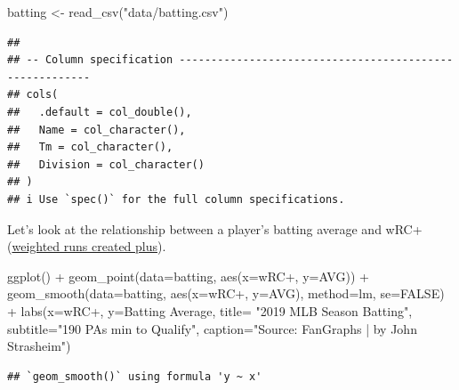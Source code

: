 \documentclass[
]{book}
\newenvironment{Shaded}{\begin{snugshade}}{\end{snugshade}}
\newcommand{\AttributeTok}[1]{\textcolor[rgb]{0.77,0.63,0.00}{#1}}
\newcommand{\ConstantTok}[1]{\textcolor[rgb]{0.00,0.00,0.00}{#1}}
\newcommand{\FunctionTok}[1]{\textcolor[rgb]{0.00,0.00,0.00}{#1}}
\newcommand{\NormalTok}[1]{#1}
\newcommand{\OtherTok}[1]{\textcolor[rgb]{0.56,0.35,0.01}{#1}}
\newcommand{\SpecialCharTok}[1]{\textcolor[rgb]{0.00,0.00,0.00}{#1}}
\newcommand{\StringTok}[1]{\textcolor[rgb]{0.31,0.60,0.02}{#1}}
\begin{document}
\begin{Shaded}
\begin{Highlighting}[]
\NormalTok{batting }\OtherTok{\textless{}{-}} \FunctionTok{read\_csv}\NormalTok{(}\StringTok{"data/batting.csv"}\NormalTok{)}
\end{Highlighting}
\end{Shaded}

\begin{verbatim}
## 
## -- Column specification --------------------------------------------------------
## cols(
##   .default = col_double(),
##   Name = col_character(),
##   Tm = col_character(),
##   Division = col_character()
## )
## i Use `spec()` for the full column specifications.
\end{verbatim}

Let's look at the relationship between a player's batting average and wRC+ (\href{http://m.mlb.com/glossary/advanced-stats/weighted-runs-created-plus}{weighted runs created plus}).

\begin{Shaded}
\begin{Highlighting}[]
\FunctionTok{ggplot}\NormalTok{() }\SpecialCharTok{+}
  \FunctionTok{geom\_point}\NormalTok{(}\AttributeTok{data=}\NormalTok{batting, }\FunctionTok{aes}\NormalTok{(}\AttributeTok{x=}\StringTok{\textasciigrave{}}\AttributeTok{wRC+}\StringTok{\textasciigrave{}}\NormalTok{, }\AttributeTok{y=}\NormalTok{AVG)) }\SpecialCharTok{+}
  \FunctionTok{geom\_smooth}\NormalTok{(}\AttributeTok{data=}\NormalTok{batting, }\FunctionTok{aes}\NormalTok{(}\AttributeTok{x=}\StringTok{\textasciigrave{}}\AttributeTok{wRC+}\StringTok{\textasciigrave{}}\NormalTok{, }\AttributeTok{y=}\NormalTok{AVG), }\AttributeTok{method=}\StringTok{\textquotesingle{}lm\textquotesingle{}}\NormalTok{, }\AttributeTok{se=}\ConstantTok{FALSE}\NormalTok{) }\SpecialCharTok{+}
  \FunctionTok{labs}\NormalTok{(}\AttributeTok{x=}\StringTok{\textquotesingle{}wRC+\textquotesingle{}}\NormalTok{, }\AttributeTok{y=}\StringTok{\textquotesingle{}Batting Average\textquotesingle{}}\NormalTok{, }\AttributeTok{title=} \StringTok{"2019 MLB Season Batting"}\NormalTok{, }\AttributeTok{subtitle=}\StringTok{"190 PAs min to Qualify"}\NormalTok{, }\AttributeTok{caption=}\StringTok{"Source:  FanGraphs | by John Strasheim"}\NormalTok{)}
\end{Highlighting}
\end{Shaded}

\begin{verbatim}
## `geom_smooth()` using formula 'y ~ x'
\end{verbatim}
\end{document}
